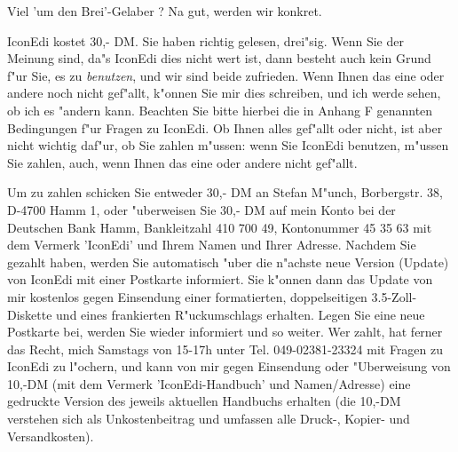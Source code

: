 Viel 'um den Brei'-Gelaber ? Na gut, werden wir konkret.

  
IconEdi kostet 30,- DM. Sie haben richtig gelesen, drei"sig. Wenn 
Sie der Meinung sind, da"s IconEdi dies nicht wert ist, dann 
besteht auch kein Grund f"ur Sie, es zu {\sl benutzen}, und wir 
sind beide zufrieden. Wenn Ihnen das eine oder andere noch nicht 
gef"allt, k"onnen Sie mir dies schreiben, und ich werde sehen, ob
ich es "andern kann. Beachten Sie bitte hierbei die in Anhang F
genannten Bedingungen f"ur Fragen zu IconEdi. Ob Ihnen alles 
gef"allt oder nicht, ist aber nicht wichtig daf"ur, ob Sie zahlen 
m"ussen: wenn Sie IconEdi benutzen, m"ussen Sie zahlen, auch, wenn 
Ihnen das eine oder andere nicht gef"allt.

  
Um zu zahlen schicken Sie entweder 30,- DM an Stefan M"unch, 
Borbergstr. 38, D-4700 Hamm 1, oder "uberweisen Sie 30,- DM 
auf mein Konto bei der Deutschen Bank Hamm, Bankleitzahl
410 700 49, Kontonummer 45 35 63 mit dem Vermerk 'IconEdi' und 
Ihrem Namen und Ihrer Adresse. Nachdem Sie gezahlt haben,
 
werden Sie automatisch "uber die n"achste neue Version (Update)
von IconEdi mit einer Postkarte informiert. Sie k"onnen dann 
das Update von mir kostenlos gegen Einsendung einer
formatierten, doppelseitigen 3.5-Zoll-Diskette und eines
frankierten R"uckumschlags erhalten.
Legen Sie eine neue Postkarte bei, werden Sie wieder informiert 
und so weiter. 
 
Wer zahlt, hat ferner das Recht, mich Samstags von
15-17h unter Tel. 049-02381-23324 mit Fragen zu IconEdi zu 
l"ochern, und kann von mir gegen Einsendung oder "Uberweisung von
10,-DM (mit dem Vermerk 'IconEdi-Handbuch' und Namen/Adresse)
eine gedruckte Version des jeweils aktuellen Handbuchs erhalten
(die 10,-DM verstehen sich als Unkostenbeitrag und umfassen alle
Druck-, Kopier- und Versandkosten).

